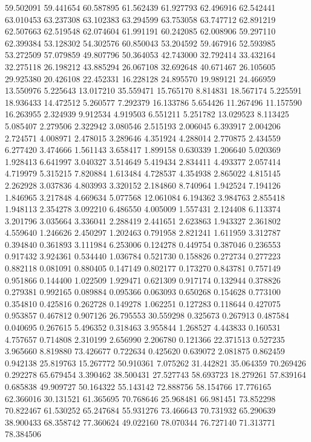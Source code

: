 59.502091
59.441654
60.587895
61.562439
61.927793
62.496916
62.542441
63.010453
63.237308
63.102383
63.294599
63.753058
63.747712
62.891219
62.507663
62.519548
62.074604
61.991191
60.242085
62.008906
59.297110
62.399384
53.128302
54.302576
60.850043
53.204592
59.467916
52.593985
53.272509
57.079859
49.807796
50.364053
42.743000
32.792414
33.432164
32.275118
26.198212
43.885294
26.067108
32.692648
40.671467
26.105605
29.925380
20.426108
22.452331
16.228128
24.895570
19.989121
24.466959
13.550976
5.225643
13.017210
35.559471
15.765170
8.814831
18.567174
5.225591
18.936433
14.472512
5.260577
7.292379
16.133786
5.654426
11.267496
11.157590
16.263955
2.324939
9.912534
4.919503
6.551211
5.251782
13.029523
8.113425
5.085407
2.279506
2.322942
3.080546
2.515193
2.006045
6.393917
2.004206
2.724571
4.008971
2.478015
3.289646
4.351924
4.288014
2.770875
2.434559
6.277420
3.474666
1.561143
3.658417
1.899158
0.630339
1.206640
5.020369
1.928413
6.641997
3.040327
3.514649
5.419434
2.834411
4.493377
2.057414
4.719979
5.315215
7.820884
1.613484
4.728537
4.354938
2.865022
4.815145
2.262928
3.037836
4.803993
3.320152
2.184860
8.740964
1.942524
7.194126
1.846965
3.217848
4.669634
5.077568
12.061084
6.194362
3.984763
2.855418
1.948113
2.354278
3.092210
6.486550
4.005009
1.557431
2.124408
6.113374
3.201796
3.035664
3.336041
2.288419
2.441651
2.623863
1.943327
2.361802
4.559640
1.246626
2.450297
1.202463
0.791958
2.821241
1.611959
3.312787
0.394840
0.361893
3.111984
6.253006
0.124278
0.449754
0.387046
0.236553
0.917432
3.924361
0.534440
1.036784
0.521730
0.158826
0.272734
0.277223
0.882118
0.081091
0.880405
0.147149
0.802177
0.173270
0.843781
0.757149
0.951866
0.144400
1.022509
1.929471
0.621309
0.917174
0.132944
0.378826
0.279381
0.992165
0.089884
0.095366
0.063093
0.650268
0.154628
0.773100
0.354810
0.425816
0.262728
0.149278
1.062251
0.127283
0.118644
0.427075
0.953857
0.467812
0.907126
26.795553
30.559298
0.325673
0.267913
0.487584
0.040695
0.267615
5.496352
0.318463
3.955844
1.268527
4.443833
0.160531
4.757657
0.714808
2.310199
2.656990
2.206780
0.121366
22.371513
0.527235
3.965660
8.819880
73.426677
0.722634
0.425620
0.639072
2.081875
0.862459
0.942138
25.819763
15.267772
50.910361
7.075262
31.442821
35.064359
70.269426
0.292278
65.679454
3.390462
38.500431
27.527743
58.693723
18.279261
57.839164
0.685838
49.909727
50.164322
55.143142
72.888756
58.154766
17.776165
62.366016
30.131521
61.365695
70.768646
25.968481
66.981451
73.852298
70.822467
61.530252
65.247684
55.931276
73.466643
70.731932
65.290639
38.900433
68.358742
77.360624
49.022160
78.070344
76.727140
71.313771
78.384506

